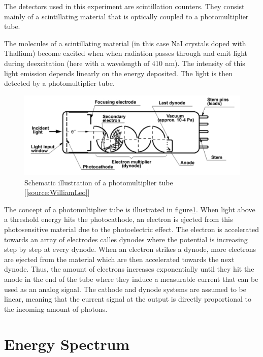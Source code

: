 \documentclass[a4paper,parskip,11pt, DIV12]{scrreprt}
\begin{document}
The detectors used in this experiment are scintillation counters. They consist mainly of a scintillating material that is optically coupled to a photomultiplier tube. 

The molecules of a scintillating material (in this case NaI crystals doped with Thallium) become excited when when radiation passes through and emit light during deexcitation (here with a wavelength of 410 nm). The intensity of this light emission depends linearly on the energy deposited. The light is then detected by a photomultiplier tube.
\begin{figure}[H]
\centering
\includegraphics[scale=1]{Photomultiplier.png}
\caption[Photomultiplier]{Schematic illustration of a photomultiplier tube [\ref{source:WilliamLeo}]}
\label{fig:Photomultiplier}
		\end{figure}
The concept of a photomultiplier tube is illustrated in figure\ref{fig:Photomultiplier}. When light above a threshold energy hits the photocathode, an electron is ejected from this photosensitive material due to the photoelectric effect. The electron is accelerated towards an array of electrodes calles dynodes where the potential is increasing step by step at every dynode. When an electron strikes a dynode, more electrons are ejected from the material which are then accelerated towards the next dynode. Thus, the amount of electrons increases exponentially until they hit the anode in the end of the tube where they induce a measurable current that can be used as an analog signal. The cathode and dynode systems are assumed to be linear, meaning that the current signal at the output is directly proportional to the incoming amount of photons.

\chapter{Energy Spectrum} \label{sec:EnergySpectrum}
\end{document}
